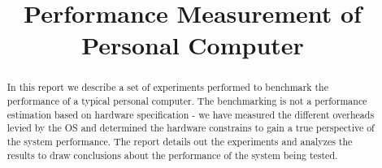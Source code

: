 \documentclass[conference]{IEEEtran}
\begin{document}
%
\title{Performance Measurement of Personal Computer}


\author{
\and
{}
}



\maketitle


\begin{abstract}

In this report we describe a set of experiments performed to benchmark the performance of a typical personal computer. The benchmarking is not a performance estimation based on hardware specification - we have measured the different overheads levied by the OS and determined the hardware constrains to gain a true perspective of the system performance. The report details out the experiments and analyzes the results to draw conclusions about the performance of the system being tested. 

\end{abstract}



\IEEEpeerreviewmaketitle



\end{document}
